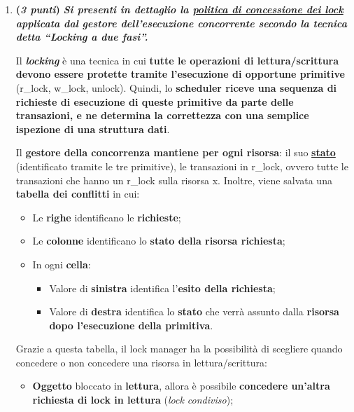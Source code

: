 \documentclass[a4paper]{article}
\newcommand{\dquotes}[1]{``#1''}
\begin{document}
\begin{enumerate}
		\item \textbf{(\emph{3 punti})} \textcolor{Green4}{\textbf{\emph{Si presenti in dettaglio la \underline{politica di concessione dei lock} applicata dal gestore dell'esecuzione concorrente secondo la tecnica detta \dquotes{Locking a due fasi}.}}}\label{dom: politica di concessione dei lock - locking a due fasi}
		
		Il \emph{\textbf{locking}} è una tecnica in cui \textbf{tutte le operazioni di lettura/scrittura devono essere protette tramite l'esecuzione di opportune primitive} (\textsf{r\_lock}, \textsf{w\_lock}, \textsf{unlock}). Quindi, lo \textbf{scheduler riceve una sequenza di richieste di esecuzione di queste primitive da parte delle transazioni, e ne determina la correttezza con una semplice ispezione di una struttura dati}.
		
		Il \textbf{gestore della concorrenza mantiene per ogni risorsa}: il suo \underline{\textbf{stato}} (identificato tramite le tre primitive), le transazioni in \textsf{r\_lock}, ovvero tutte le transazioni che hanno un \textsf{r\_lock} sulla risorsa x. Inoltre, viene salvata una \textbf{tabella dei conflitti} in cui:
		\begin{itemize}
			\item Le \textbf{righe} identificano le \textbf{richieste};
			
			\item Le \textbf{colonne} identificano lo \textbf{stato della risorsa richiesta};
			
			\item In ogni \textbf{cella}:
			\begin{itemize}
				\item Valore di \textbf{sinistra} identifica l'\textbf{esito della richiesta};
				
				\item Valore di \textbf{destra} identifica lo \textbf{stato} che verrà assunto dalla \textbf{risorsa dopo l'esecuzione della primitiva}.
			\end{itemize}
		\end{itemize}
		
		Grazie a questa tabella, il lock manager ha la possibilità di scegliere quando concedere o non concedere una risorsa in lettura/scrittura:
		\begin{itemize}
			\item \textbf{Oggetto} bloccato in \textbf{lettura}, allora è possibile \textbf{concedere un'altra richiesta di lock in lettura} (\emph{lock condiviso});
			

\end{itemize}
\end{enumerate}
\end{document}
